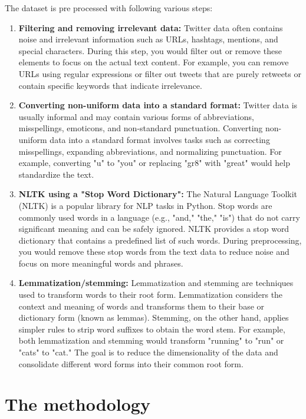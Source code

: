\documentclass[conference]{IEEEtran}
\begin{document}
The dataset is pre processed with following various steps:

\begin{enumerate}

\item \textbf{Filtering and removing irrelevant data:}
Twitter data often contains noise and irrelevant information such as URLs, hashtags, mentions, and special characters. During this step, you would filter out or remove these elements to focus on the actual text content. For example, you can remove URLs using regular expressions or filter out tweets that are purely retweets or contain specific keywords that indicate irrelevance.


\item \textbf{Converting non-uniform data into a standard format:}
Twitter data is usually informal and may contain various forms of abbreviations, misspellings, emoticons, and non-standard punctuation. Converting non-uniform data into a standard format involves tasks such as correcting misspellings, expanding abbreviations, and normalizing punctuation. For example, converting "u" to "you" or replacing "gr8" with "great" would help standardize the text.


\item \textbf{NLTK using a "Stop Word Dictionary":}
The Natural Language Toolkit (NLTK) is a popular library for NLP tasks in Python. Stop words are commonly used words in a language (e.g., "and," "the," "is") that do not carry significant meaning and can be safely ignored. NLTK provides a stop word dictionary that contains a predefined list of such words. During preprocessing, you would remove these stop words from the text data to reduce noise and focus on more meaningful words and phrases.


\item \textbf{Lemmatization/stemming:}
Lemmatization and stemming are techniques used to transform words to their root form. Lemmatization considers the context and meaning of words and transforms them to their base or dictionary form (known as lemmas). Stemming, on the other hand, applies simpler rules to strip word suffixes to obtain the word stem. For example, both lemmatization and stemming would transform "running" to "run" or "cats" to "cat." The goal is to reduce the dimensionality of the data and consolidate different word forms into their common root form.

\end{enumerate}

\section{The methodology }
\end{document}
